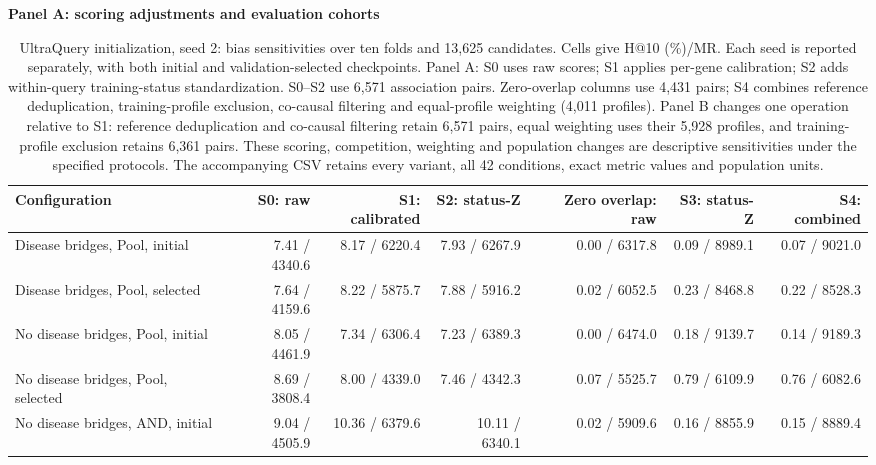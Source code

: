\begin{landscape}
\begin{table}[p]
\centering\footnotesize
\setlength{\tabcolsep}{3pt}
\caption{UltraQuery initialization, seed 2: bias sensitivities over ten folds and 13,625 candidates. Cells give H@10 (\%)/MR. Each seed is reported separately, with both initial and validation-selected checkpoints. Panel A: S0 uses raw scores; S1 applies per-gene calibration; S2 adds within-query training-status standardization. S0--S2 use 6,571 association pairs. Zero-overlap columns use 4,431 pairs; S4 combines reference deduplication, training-profile exclusion, co-causal filtering and equal-profile weighting (4,011 profiles). Panel B changes one operation relative to S1: reference deduplication and co-causal filtering retain 6,571 pairs, equal weighting uses their 5,928 profiles, and training-profile exclusion retains 6,361 pairs. These scoring, competition, weighting and population changes are descriptive sensitivities under the specified protocols. The accompanying CSV retains every variant, all 42 conditions, exact metric values and population units.}
\label{tab:controlled_bias_ultraquery-seed2}
\textbf{Panel A: scoring adjustments and evaluation cohorts}\par\smallskip
\begin{adjustbox}{max width=\linewidth}
\begin{tabular}{lrrrrrr}
\toprule
Configuration & S0: raw & S1: calibrated & S2: status-Z & Zero overlap: raw & S3: status-Z & S4: combined \\
\midrule
Disease bridges, Pool, initial & 7.41 / 4340.6 & 8.17 / 6220.4 & 7.93 / 6267.9 & 0.00 / 6317.8 & 0.09 / 8989.1 & 0.07 / 9021.0 \\
Disease bridges, Pool, selected & 7.64 / 4159.6 & 8.22 / 5875.7 & 7.88 / 5916.2 & 0.02 / 6052.5 & 0.23 / 8468.8 & 0.22 / 8528.3 \\
No disease bridges, Pool, initial & 8.05 / 4461.9 & 7.34 / 6306.4 & 7.23 / 6389.3 & 0.00 / 6474.0 & 0.18 / 9139.7 & 0.14 / 9189.3 \\
No disease bridges, Pool, selected & 8.69 / 3808.4 & 8.00 / 4339.0 & 7.46 / 4342.3 & 0.07 / 5525.7 & 0.79 / 6109.9 & 0.76 / 6082.6 \\
No disease bridges, AND, initial & 9.04 / 4505.9 & 10.36 / 6379.6 & 10.11 / 6340.1 & 0.02 / 5909.6 & 0.16 / 8855.9 & 0.15 / 8889.4 \\

\end{tabular}
\end{adjustbox}
\end{table}
\end{landscape}
